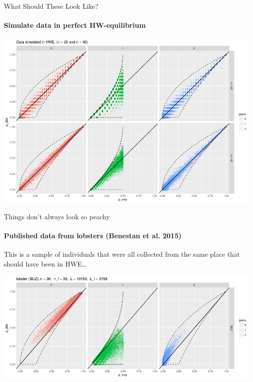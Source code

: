 \documentclass[letter,graphicx]{beamer}
\begin{document}
\begin{frame}{What Should These Look Like?}
\framesubtitle{Simulate data in perfect HW-equilibrium}

\begin{center}
\includegraphics[width=1.0\textwidth]{../figures/simulated-nice-data.png}
\end{center}
\end{frame}







\begin{frame}{Things don't always look so peachy}
\framesubtitle{Published data from lobsters (Benestan et al. 2015)}

This is a sample of individuals that were all collected from the same place that should have been
in HWE\ldots

\begin{center}
\includegraphics[width=1.0\textwidth]{./images/lobster_big_pop.png}
\end{center}
\end{frame}
\end{document}
